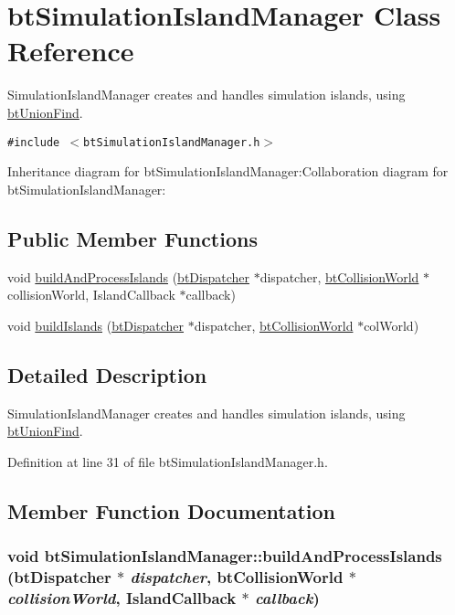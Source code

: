 \hypertarget{classbt_simulation_island_manager}{
\section{btSimulationIslandManager Class Reference}
\label{classbt_simulation_island_manager}
}
SimulationIslandManager creates and handles simulation islands, using \hyperlink{classbt_union_find}{btUnionFind}.  


{\tt \#include $<$btSimulationIslandManager.h$>$}

Inheritance diagram for btSimulationIslandManager:Collaboration diagram for btSimulationIslandManager:\subsection*{Public Member Functions}
\begin{CompactItemize}
\item 
void \hyperlink{classbt_simulation_island_manager_b0f52dc46bc01c6754f4cb32ba26c99a}{buildAndProcessIslands} (\hyperlink{classbt_dispatcher}{btDispatcher} $\ast$dispatcher, \hyperlink{classbt_collision_world}{btCollisionWorld} $\ast$collisionWorld, IslandCallback $\ast$callback)
\item 
void \hyperlink{classbt_simulation_island_manager_ea0b5869eca2d034ac9c643e149a5e01}{buildIslands} (\hyperlink{classbt_dispatcher}{btDispatcher} $\ast$dispatcher, \hyperlink{classbt_collision_world}{btCollisionWorld} $\ast$colWorld)
\end{CompactItemize}


\subsection{Detailed Description}
SimulationIslandManager creates and handles simulation islands, using \hyperlink{classbt_union_find}{btUnionFind}. 

Definition at line 31 of file btSimulationIslandManager.h.

\subsection{Member Function Documentation}
\hypertarget{classbt_simulation_island_manager_b0f52dc46bc01c6754f4cb32ba26c99a}{
\subsubsection[buildAndProcessIslands]{\setlength{\rightskip}{0pt plus 5cm}void btSimulationIslandManager::buildAndProcessIslands ({\bf btDispatcher} $\ast$ {\em dispatcher}, \/  {\bf btCollisionWorld} $\ast$ {\em collisionWorld}, \/  IslandCallback $\ast$ {\em callback})}}
\label{classbt_simulation_island_manager_b0f52dc46bc01c6754f4cb32ba26c99a}


